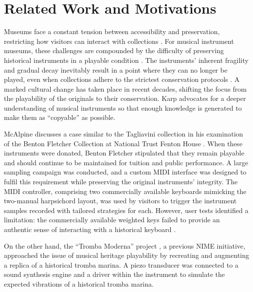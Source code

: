 \section{Related Work and Motivations}\label{related-work}


Museums face a constant tension between accessibility and preservation, restricting how visitors can interact with collections \cite{Templeton2018, McAlpine2014}. For musical instrument museums, these challenges are compounded by the difficulty of preserving historical instruments in a playable condition \cite{McAlpine2014}. The instruments' inherent fragility and gradual decay inevitably result in a point where they can no longer be played, even when collections adhere to the strictest conservation protocols \cite{NYT_strad}. A marked cultural change has taken place in recent decades, shifting the focus from the playability of the originals to their conservation. Karp \cite{Karp1979,Karp1985} advocates for a deeper understanding of musical instruments so that enough knowledge is generated to make them as ``copyable'' as possible.

McAlpine discusses a case similar to the Tagliavini collection in his examination of the Benton Fletcher Collection at National Trust Fenton House \cite{McAlpine2014}. When these instruments were donated, Benton Fletcher stipulated that they remain playable and should continue to be maintained for tuition and public performance. A large sampling campaign was conducted, and a custom MIDI interface was designed to fulfil this requirement while preserving the original instruments' integrity. The MIDI controller, comprising two commercially available keyboards mimicking the two-manual harpsichord layout, was used by visitors to trigger the instrument samples recorded with tailored strategies for each. However, user tests identified a limitation: the commercially available weighted keys failed to provide an authentic sense of interacting with a historical keyboard \cite{McAlpine2014}. 

On the other hand, the ``Tromba Moderna'' project \cite{Baldwin2016}, a previous NIME initiative, approached the issue of musical heritage playability by recreating and augmenting a replica of a historical tromba marina. A piezo transducer was connected to a sound synthesis engine and a driver within the instrument to simulate the expected vibrations of a historical tromba marina. 


